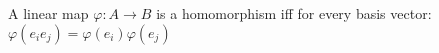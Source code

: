 \begin{theorem}
    A linear map $\varphi: A \to B$ is a homomorphism iff for every basis vector: $\varphi(e_ie_j) = \varphi(e_i)\varphi(e_j)$
\end{theorem}
